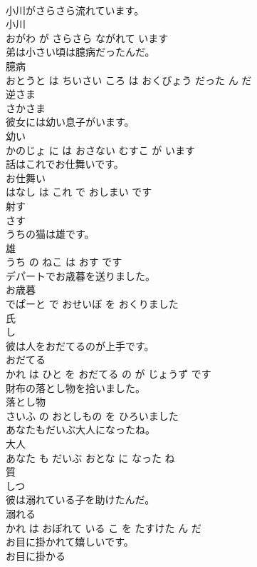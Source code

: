 \documentclass[8pt]{extreport}
\begin{document}
\begin{CJK}{UTF8}{min}
\\	小川がさらさら流れています。	
\\	小川 
\\	おがわ が さらさら ながれて います			
\\	弟は小さい頃は臆病だったんだ。	
\\	臆病 
\\	おとうと は ちいさい ころ は おくびょう だった ん だ			
\\	逆さま	
\\	さかさま			
\\	彼女には幼い息子がいます。	
\\	幼い 
\\	かのじょ に は おさない むすこ が います			
\\	話はこれでお仕舞いです。	
\\	お仕舞い 
\\	はなし は これ で おしまい です			
\\	射す	
\\	さす			
\\	うちの猫は雄です。	
\\	雄 
\\	うち の ねこ は おす です			
\\	デパートでお歳暮を送りました。	
\\	お歳暮 
\\	でぱーと で おせいぼ を おくりました			
\\	氏	
\\	し			
\\	彼は人をおだてるのが上手です。	
\\	おだてる 
\\	かれ は ひと を おだてる の が じょうず です			
\\	財布の落とし物を拾いました。	
\\	落とし物 
\\	さいふ の おとしもの を ひろいました			
\\	あなたもだいぶ大人になったね。	
\\	大人 
\\	あなた も だいぶ おとな に なった ね			
\\	質	
\\	しつ			
\\	彼は溺れている子を助けたんだ。	
\\	溺れる 
\\	かれ は おぼれて いる こ を たすけた ん だ			
\\	お目に掛かれて嬉しいです。	
\\	お目に掛かる 

\end{CJK}
\end{document}
